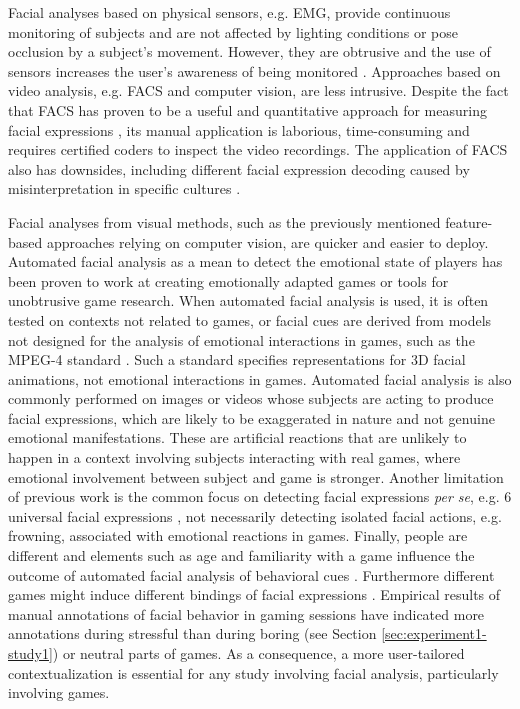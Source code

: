 Facial analyses based on physical sensors, e.g. EMG, provide continuous monitoring of subjects and are not affected by lighting conditions or pose occlusion by a subject's movement. However, they are obtrusive and the use of sensors increases the user's awareness of being monitored \parencite{yamakoshi2007preliminary,yamaguchi2006evaluation,healey2005detecting}. Approaches based on video analysis, e.g. FACS and computer vision, are less intrusive. Despite the fact that FACS has proven to be a useful and quantitative approach for measuring facial expressions \parencite{bartlett1999measuring}, its manual application is laborious, time-consuming and requires certified coders to inspect the video recordings. The application of FACS also has downsides, including different facial expression decoding caused by misinterpretation in specific cultures \parencite{jack2013culture}.

Facial analyses from visual methods, such as the previously mentioned feature-based approaches relying on computer vision, are quicker and easier to deploy. Automated facial analysis as a mean to detect the emotional state of players has been proven to work at creating emotionally adapted games \parencite{saari2004towards} or tools for unobtrusive game research. When automated facial analysis is used, it is often tested on contexts not related to games, or facial cues are derived from models not designed for the analysis of emotional interactions in games, such as the MPEG-4 standard \parencite{abrantes1999mpeg}. Such a standard specifies representations for 3D facial animations, not emotional interactions in games. Automated facial analysis is also commonly performed on images or videos whose subjects are acting to produce facial expressions, which are likely to be exaggerated in nature and not genuine emotional manifestations. These are artificial reactions that are unlikely to happen in a context involving subjects interacting with real games, where emotional involvement between subject and game is stronger. Another limitation of previous work is the common focus on detecting facial expressions \textit{per se}, e.g. 6 universal facial expressions \parencite{ekman1971constants}, not necessarily detecting isolated facial actions, e.g. frowning, associated with emotional reactions in games. Finally, people are different and elements such as age and familiarity with a game influence the outcome of automated facial analysis of behavioral cues \parencite{asteriadis2012towards}. Furthermore different games might induce different bindings of facial expressions \parencite{tan2014correlation}. Empirical results of manual annotations of facial behavior in gaming sessions have indicated more annotations during stressful than during boring (see Section \ref{sec:experiment1-study1}) or neutral \parencite{kaiser1994multi} parts of games. As a consequence, a more user-tailored contextualization is essential for any study involving facial analysis, particularly involving games.

